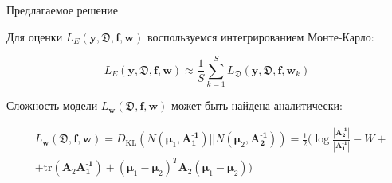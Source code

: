 \documentclass{beamer}
\newcommand{\DD}{{\mathfrak{D}}}
\newcommand{\FFF}{{\mathfrak{F}}}
\newcommand{\bw}{{\textbf{w}}}
\newcommand{\II}{{\textbf{I}}}
\newcommand{\bbf}{{\textbf{f}}}
\newcommand{\by}{{\textbf{y}}}
\newcommand{\bm}{{\textbf{m}}}
\newcommand{\bAo}{\mathbf{A^\text{-1}_\text{1}}}
\newcommand{\bAt}{\mathbf{A^\text{-1}_\text{2}}}
\newcommand{\bmuo}{{\boldsymbol{\mu}_1}}
\newcommand{\bmut}{{\boldsymbol{\mu}_2}}
\newcommand{\DKL}{\mathit{D}_{\text{KL}}}
\begin{document}
%	
%

\begin{frame}{Предлагаемое решение}

Для оценки $L_E(\by,\DD,\bbf,\bw)$ воспользуемся интегрированием Монте-Карло:

$$L_E(\by,\DD,\bbf,\bw) \approx \frac1S\sum\limits_{k=1}^S L_\DD(\by,\DD, \bbf,\bw_k)$$

Сложность модели $L_\bw(\DD,\bbf,\bw)$ может быть найдена аналитически:

\begin{align*}
&L_\bw(\DD,\bbf,\bw) = \DKL(N(\bmuo,\bAo)||N(\bmut,\bAt)) = \frac12 \big( \log \frac{|\bAt|}{|\bAo|}-W+\\
&+\text{tr}(\textbf{A}_2\bAo)+(\bmuo-\bmut)^T\textbf{A}_2(\bmuo-\bmut) \big) 
\end{align*}

\end{frame}

%
%
%
%
%
%
%
\end{document}
